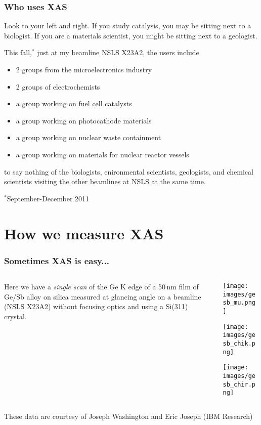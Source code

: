 \documentclass[10pt, xcolor=x11names, compress]{beamer}
\begin{document}
\begin{frame}
  \frametitle{Who uses XAS}
  Look to your left and right.  If you study catalysis, you may be
  sitting next to a biologist.  If you are a materials scientist, you
  might be sitting next to a geologist.

  \begin{block}{This fall,$^\ast$ just at my beamline NSLS X23A2, the users include}
    \begin{itemize}
    \item 2 groups from the microelectronics industry
    \item 2 groups of electrochemists
    \item a group working on fuel cell catalysts
    \item a group working on photocathode materials
    \item a group working on nuclear waste containment
    \item a group working on materials for nuclear reactor vessels
    \end{itemize}
  \end{block}

  to say nothing of the biologists, enironmental scientists,
  geologists, and chemical scientists visiting the other beamlines at
  NSLS at the same time.

  \begin{bottomnote}[0.5][20]
    $^\ast$September-December 2011
  \end{bottomnote}
\end{frame}

\section{How we measure XAS}

\begin{frame}
  \frametitle{Sometimes XAS is easy...}
  \begin{columns}
    \begin{column}{0.60\linewidth}
      Here we have a \textit{single scan} of the Ge K edge of a 50\,nm
      film of Ge/Sb alloy on silica measured at glancing angle on a
      beamline (NSLS X23A2) without focusing optics and using a
      Si(311) crystal.
    \end{column}
    \begin{column}{0.36\linewidth}
      \texttt{[image: images/gesb\_mu.png]}

      \texttt{[image: images/gesb\_chik.png]}      

      \texttt{[image: images/gesb\_chir.png]}
    \end{column}
  \end{columns}
  \begin{bottomnote}[0.4][19.0]
    These data are courtesy of Joseph Washington and Eric
    Joseph (IBM Research)
  \end{bottomnote}
\end{frame}
\end{document}
